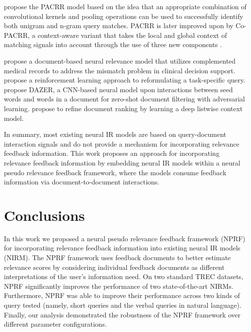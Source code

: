 \documentclass[11pt,a4paper]{article}
\begin{document}
\cite{DBLP:conf/emnlp/HuiYBM17} propose the PACRR model based on the idea that an appropriate combination of convolutional kernels and pooling operations can be used to successfully identify both unigram and n-gram query matches. PACRR is later improved upon by Co-PACRR, a context-aware variant that takes the local and global context of matching signals into account through the use of three new components \cite{DBLP:conf/wsdm/HuiYBM18}.

\cite{DBLP:conf/bibm/RanHHXS17} propose a document-based neural relevance model that utilizes complemented medical records to address the mismatch problem in  clinical decision support. \cite{DBLP:conf/emnlp/NogueiraC17} propose a reinforcement learning approach to reformulating a task-specific query. \cite{DBLP:conf/acl/JiCLZD18} propose DAZER, a CNN-based neural model upon interactions between seed words and words in a document for zero-shot document filtering with adversarial learning. \cite{DBLP:conf/sigir/AiBGC18} propose to refine document ranking by learning a deep listwise context model. 

In summary, most existing neural IR models are based on query-document interaction signals and do not provide a mechanism for 
incorporating relevance feedback information. This work proposes an approach for incorporating relevance feedback information by embedding neural IR models within a neural pseudo relevance feedback framework, where the models consume feedback information via document-to-document interactions.













 
\vspace{\vignore}
\section{Conclusions}\label{sec:Conclusions}
\vspace{\vignore}
In this work we proposed a neural pseudo relevance feedback framework (NPRF) for incorporating relevance feedback information into existing neural IR models (NIRM).
The NPRF framework uses feedback documents to better estimate relevance scores by considering individual feedback documents as different interpretations of the user's
information need. On two standard TREC datasets, NPRF significantly improves the performance of two
state-of-the-art NIRMs. Furthermore, NPRF was able to improve their performance across
two kinds of query tested (namely, short queries and the verbal queries in natural language).
Finally, our analysis demonstrated the robustness of the NPRF framework over different parameter configurations.
\end{document}
